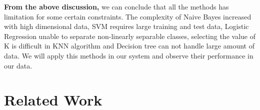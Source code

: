 \par
\vspace{0.7cm}
\noindent
\textbf{From the above discussion,} we can conclude that all the methods has limitation for some certain constraints. The complexity of Naive Bayes increased with high dimensional data, SVM requires large training and test data, Logistic Regression unable to separate non-linearly separable classes, selecting the value of K is difficult in KNN algorithm and Decision tree can not handle large amount of data. We will apply this methods in our system and observe their performance in our data.

\section{Related Work}

